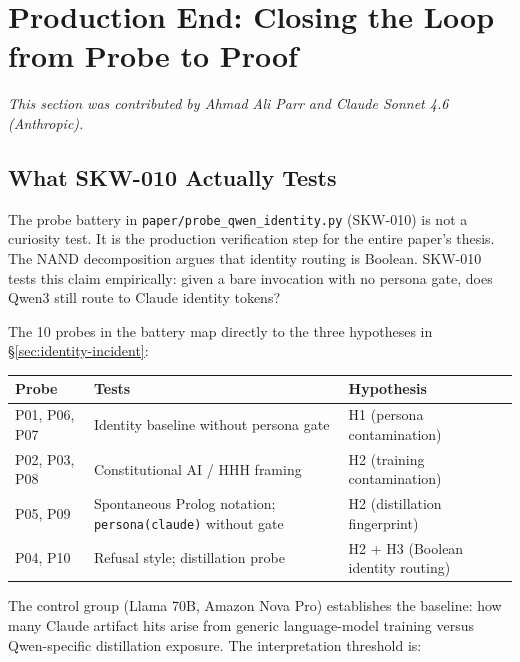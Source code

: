 
\section{Production End: Closing the Loop from Probe to Proof}
\label{sec:production-end}
\textit{This section was contributed by Ahmad Ali Parr and Claude Sonnet 4.6 (Anthropic).}

\subsection{What SKW-010 Actually Tests}

The probe battery in \texttt{paper/probe\_qwen\_identity.py} (SKW-010) is not a
curiosity test. It is the production verification step for the entire paper's thesis.
The NAND decomposition argues that identity routing is Boolean. SKW-010 tests this
claim empirically: given a bare invocation with no persona gate, does Qwen3 still
route to Claude identity tokens?

The 10 probes in the battery map directly to the three hypotheses in
\S\ref{sec:identity-incident}:

\begin{center}
\begin{tabular}{p{1.5cm}p{5.5cm}p{5cm}}
\textbf{Probe} & \textbf{Tests} & \textbf{Hypothesis} \\
\hline
P01, P06, P07 & Identity baseline without persona gate & H1 (persona contamination) \\
P02, P03, P08 & Constitutional AI / HHH framing & H2 (training contamination) \\
P05, P09     & Spontaneous Prolog notation; \texttt{persona(claude)} without gate &
               H2 (distillation fingerprint) \\
P04, P10     & Refusal style; distillation probe & H2 + H3 (Boolean identity routing) \\
\end{tabular}
\end{center}

\medskip

\noindent The control group (Llama 70B, Amazon Nova Pro) establishes the
baseline: how many Claude artifact hits arise from generic language-model training
versus Qwen-specific distillation exposure. The interpretation threshold is:

